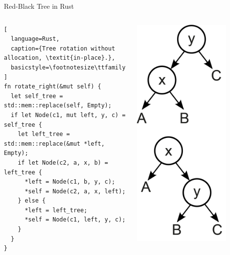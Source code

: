 \begin{frame}[fragile]{Red-Black Tree in Rust}
\begin{columns}
\begin{lstlisting}[
  language=Rust,
  caption={Tree rotation without allocation, \textit{in-place}.},
  basicstyle=\footnotesize\ttfamily
]
fn rotate_right(&mut self) {
  let self_tree = std::mem::replace(self, Empty);
  if let Node(c1, mut left, y, c) = self_tree {
    let left_tree = std::mem::replace(&mut *left, Empty);
    if let Node(c2, a, x, b) = left_tree {
      *left = Node(c1, b, y, c);
      *self = Node(c2, a, x, left);
    } else {
      *left = left_tree;
      *self = Node(c1, left, y, c);
    }
  }
}
\end{lstlisting}
\centering
\includegraphics[width=0.8\textwidth]{img/rotate_right.png}
\end{columns}
\end{frame}


